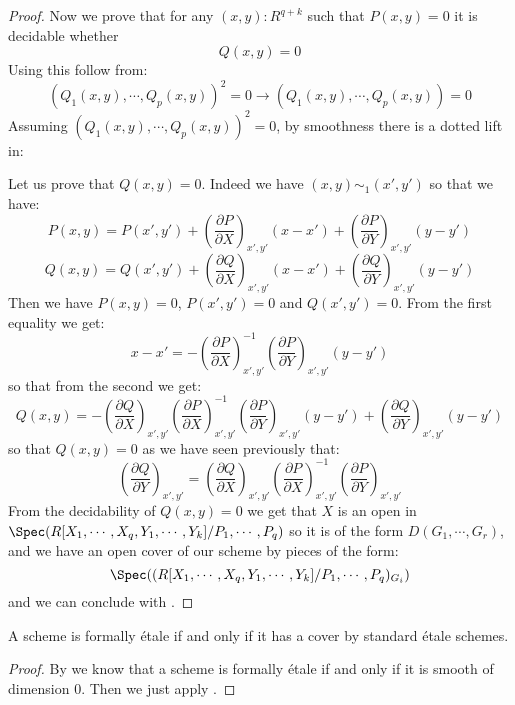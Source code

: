 \begin{proof}
Now we prove that for any $(x,y):R^{q+k}$ such that $P(x,y)=0$ it is decidable whether
\[Q(x,y)=0 \] 
Using  this follow from:
\[(Q_1(x,y),\cdots,Q_p(x,y))^2=0 \to (Q_1(x,y),\cdots,Q_p(x,y))=0\]
Assuming $(Q_1(x,y),\cdots,Q_p(x,y))^2=0$, by smoothness there is a dotted lift in:
\begin{center}
\end{center}
Let us prove that $Q(x,y) = 0$. Indeed we have $(x,y) \sim_1 (x',y')$ so that we have:
\[P(x,y) = P(x',y')+ \left(\frac{\partial P}{\partial X}\right)_{x',y'}(x-x') + \left(\frac{\partial P}{\partial Y}\right)_{x',y'}(y-y') \]
\[Q(x,y) = Q(x',y')+ \left(\frac{\partial Q}{\partial X}\right)_{x',y'}(x-x') + \left(\frac{\partial Q}{\partial Y}\right)_{x',y'}(y-y') \]
Then we have $P(x,y) = 0$, $P(x',y')=0$ and $Q(x',y') = 0$. From the first equality we get:
\[x-x' =  -\left(\frac{\partial P}{\partial X}\right)_{x',y'}^{-1}\left(\frac{\partial P}{\partial Y}\right)_{x',y'}(y-y')\]
so that from the second we get:
\[Q(x,y) = -\left(\frac{\partial Q}{\partial X}\right)_{x',y'}\left(\frac{\partial P}{\partial X}\right)_{x',y'}^{-1}\left(\frac{\partial P}{\partial Y}\right)_{x',y'}(y-y') + \left(\frac{\partial Q}{\partial Y}\right)_{x',y'}(y-y')\]
so that $Q(x,y)=0$ as we have seen previously that:
\[\left(\frac{\partial Q}{\partial Y}\right)_{x',y'} = \left(\frac{\partial Q}{\partial X}\right)_{x',y'}\left(\frac{\partial P}{\partial X}\right)_{x',y'}^{-1} \left(\frac{\partial P}{\partial Y}\right)_{x',y'} \]
From the decidability of $Q(x,y)=0$ we get that $X$ is an open in $\Spec(R[X_1,\cdots,X_q,Y_1,\cdots,Y_k]/P_1,\cdots,P_q)$
so it is of the form $D(G_1,\cdots,G_r)$, and we have an open cover of our scheme by pieces of the form:
\[\Spec((R[X_1,\cdots,X_q,Y_1,\cdots,Y_k]/P_1,\cdots,P_q)_{G_i})\]
and we can conclude with .
\end{proof}

\begin{corollary}
A scheme is formally étale if and only if it has a cover by standard étale schemes.
\end{corollary}

\begin{proof}
By  we know that a scheme is formally étale if and only if it is smooth of dimension $0$. Then we just apply .
\end{proof}

